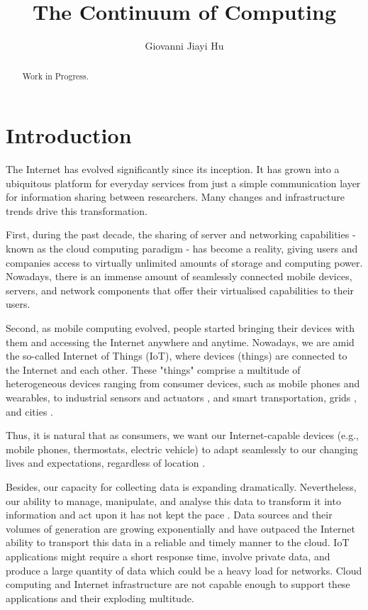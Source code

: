 \documentclass{ieeeaccess}
\begin{document}

\title{The Continuum of Computing}
\author{Giovanni Jiayi Hu}
\address[1]{Department of Mathematics, University of Padua, Italy I-35121}

\begin{abstract}
Work in Progress.
\end{abstract}

\titlepgskip=-15pt

\maketitle

\section{Introduction}
\label{sec:introduction}

The Internet has evolved significantly since its inception. It has grown into a ubiquitous platform for everyday services from just a simple communication layer for information sharing between researchers. Many changes and infrastructure trends drive this transformation.

First, during the past decade, the sharing of server and networking capabilities - known as the cloud computing paradigm - has become a reality, giving users and companies access to virtually unlimited amounts of storage and computing power. Nowadays, there is an immense amount of seamlessly connected mobile devices, servers, and network components that offer their virtualised capabilities to their users.

Second, as mobile computing evolved, people started bringing their devices with them and accessing the Internet anywhere and anytime. Nowadays, we are amid the so-called Internet of Things (IoT), where devices (things) are connected to the Internet and each other. These "things" comprise a multitude of heterogeneous devices ranging from consumer devices, such as mobile phones and wearables, to industrial sensors and actuators \cite{iot-manifacturing}, and smart transportation, grids \cite{dsu}, and cities \cite{saaas}.

Thus, it is natural that as consumers, we want our Internet-capable devices (e.g., mobile phones, thermostats, electric vehicle) to adapt seamlessly to our changing lives and expectations, regardless of location \cite{harnessing-continuum}.

Besides, our capacity for collecting data is expanding dramatically. Nevertheless, our ability to manage, manipulate, and analyse this data to transform it into information and act upon it has not kept the pace \cite{computing-in-continuum}. Data sources and their volumes of generation are growing exponentially and have outpaced the Internet ability to transport this data in a reliable and timely manner to the cloud. IoT applications might require a short response time, involve private data, and produce a large quantity of data which could be a heavy load for networks. Cloud computing and Internet infrastructure are not capable enough to support these applications and their exploding multitude.
\end{document}

